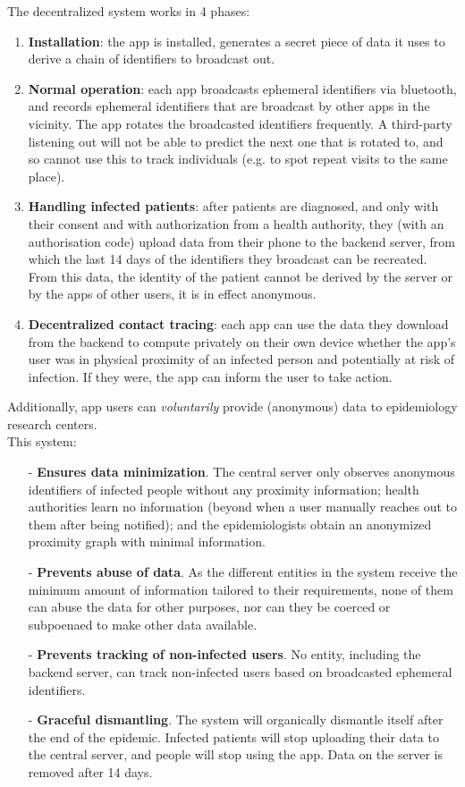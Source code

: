 \documentclass[12pt,a4paper]{article}
\begin{document}
The decentralized system works in 4 phases:
\begin{enumerate}\itemsep0pt
\item \textbf{Installation}: the app is installed, generates a secret piece of data it uses to derive a chain of identifiers to broadcast out.
\item \textbf{Normal operation}: each app broadcasts ephemeral identifiers via bluetooth, and records ephemeral identifiers that are broadcast by other apps in the vicinity. The app rotates the broadcasted identifiers frequently. A third-party listening out will not be able to predict the next one that is rotated to, and so cannot use this to track
individuals (e.g. to spot repeat visits to the same place).
\item \textbf{Handling infected patients}: after patients are diagnosed, and only with their consent and with authorization from a health authority, they (with an authorisation
code) upload data from their phone to the backend server, from which the last 14
days of the identifiers they broadcast can be recreated. From this data, the identity of
the patient cannot be derived by the server or by the apps of other users, it is in effect
anonymous.
\item \textbf{Decentralized contact tracing}: each app can use the data they download from the backend to compute privately on their own device whether the app’s user was in
physical proximity of an infected person and potentially at risk of infection. If they
were, the app can inform the user to take action.
\end{enumerate}
Additionally, app users can \textit{voluntarily} provide (anonymous) data to epidemiology research
centers.\\[0.4cm]
This system:
\begin{itemize}\itemsep0pt
\item[-] \textbf{Ensures data minimization}. The central server only observes anonymous identifiers
of infected people without any proximity information; health authorities learn no information (beyond when a user manually reaches out to them after being notified); and the epidemiologists obtain an anonymized proximity graph with minimal information.
\item[-] \textbf{Prevents abuse of data}. As the different entities in the system receive the minimum amount of information tailored to their requirements, none of them can abuse the data for other purposes, nor can they be coerced or subpoenaed to make other data available.
\item[-] \textbf{Prevents tracking of non-infected users}. No entity, including the backend server, can track non-infected users  based on broadcasted ephemeral identifiers.
\item[-] \textbf{Graceful dismantling}. The system will organically dismantle itself after the end of the epidemic. Infected patients will stop uploading their data to the central server, and people will stop using the app. Data on the server is removed after 14 days.
\end{itemize}
\end{document}

